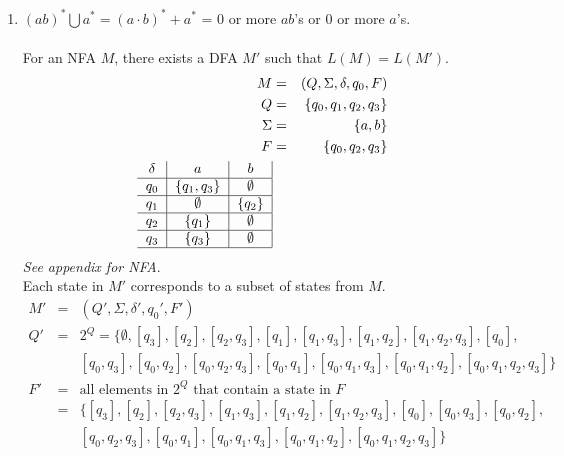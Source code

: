 \documentclass[10pt,a4paper,final]{article}
\begin{document}
\begin{enumerate}
  \begin{enumerate}
  \item $(ab)^* \bigcup a^* = (a \cdot b)^* + a^*$ = 0 or more $ab$'s or 0 or more $a$'s.\\
  \\
  For an NFA $M$, there exists a DFA $M'$ such that $L(M) = L(M')$.
  \begin{eqnarray*}
    M &=& (Q, \Sigma, \delta, q_0, F)\\
    Q &=& \{q_0,q_1,q_2,q_3\}\\
    \Sigma &=& \{a,b\}\\
    F &=& \{q_0,q_2,q_3\}\\
    \begin{tabular}{c|c|c|}
    $\delta$ & $a$ & $b$ \\ 
    \hline 
    $q_0$ & $\{q_1,q_3\}$ & $\emptyset$ \\
    \hline 
    $q_1$ & $\emptyset$ & $\{q_2\}$ \\ 
    \hline 
    $q_2$ & $\{q_1\}$ & $\emptyset$ \\ 
    \hline 
    $q_3$ & $\{q_3\}$ & $\emptyset$ \\ 
    \hline 
    \end{tabular} 
  \end{eqnarray*}
  \emph{See appendix for NFA}.\\

  Each state in $M'$ corresponds to a subset of states from $M$.
  \begin{eqnarray*}
   M' &=& (Q', \Sigma, \delta', q_0', F')\\
   Q' &=& 2^Q = \{\emptyset, [q_3], [q_2], [q_2,q_3], [q_1], [q_1,q_3],[q_1,q_2],[q_1,q_2,q_3],[q_0],\\
   & & [q_0,q_3], [q_0,q_2], [q_0,q_2,q_3], [q_0,q_1], [q_0,q_1,q_3],
   [q_0,q_1,q_2], [q_0,q_1,q_2,q_3]\}\\
   F' &=& \mbox{all elements in $2^Q$ that contain a state in $F$}\\
   &=& \{[q_3], [q_2], [q_2,q_3], [q_1,q_3], [q_1,q_2], [q_1,q_2,q_3], [q_0], [q_0,q_3], [q_0,q_2],\\
   & & [q_0,q_2,q_3], [q_0,q_1], [q_0,q_1,q_3], [q_0,q_1,q_2], [q_0,q_1,q_2,q_3]\}
  \end{eqnarray*}
  

\end{enumerate}
\end{enumerate}
\end{document}
